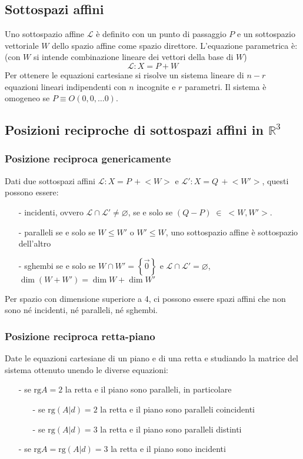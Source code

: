 \documentclass[a4paper]{article}
\newcommand\rg{\text{rg}} 		%
\begin{document}
\subsection{Sottospazi affini}
Uno sottospazio affine \(\mathcal{L}\) è definito con un punto di passaggio \(P\) e un sottospazio vettoriale \(W\) dello spazio
affine come spazio direttore. L'equazione parametrica è: (con \(W\) si intende combinazione lineare dei vettori della base di \(W\))
\[\mathcal{L} : X = P + W\]
Per ottenere le equazioni cartesiane si risolve un sistema lineare di \(n-r\) equazioni lineari indipendenti con \(n\) incognite
e \(r\) parametri. Il sistema è omogeneo se \(P \equiv O(0,0, \dots 0)\).

\subsection{Posizioni reciproche di sottospazi affini in \(\mathbb{R}^3\)}
\subsubsection*{Posizione reciproca genericamente}
Dati due sottospazi affini \(\mathcal{L}: X = P \, + \! <W>\) e \(\mathcal{L}': X = Q \, + \! <W'>\), questi possono essere:
\begin{itemize}[topsep=3pt, itemsep=0pt]
	\item[-] incidenti, ovvero \(\mathcal{L} \cap \mathcal{L}' \neq \varnothing\), se e solo se \((Q-P) \; \in \; <W, W'>\).
	\item[-] paralleli se e solo se \(W \leq W'\) o \(W' \leq W\), uno sottospazio affine è sottospazio dell'altro 
	\item[-] sghembi se e solo se \(W \cap W' = \left\{ \vec{0} \right\}\) e \(\mathcal{L} \cap \mathcal{L}' = \varnothing\), \(\dim (W + W') = \dim W + \dim W'\)
\end{itemize}
Per spazio con dimensione superiore a 4, ci possono essere spazi affini che non sono né incidenti, né paralleli, né sghembi.

\subsubsection*{Posizione reciproca retta-piano}
Date le equazioni cartesiane di un piano e di una retta e studiando la matrice del sistema ottenuto unendo le diverse equazioni:
\begin{itemize}[topsep=3pt, itemsep=0pt]
	\item[-] se \(\rg A = 2\) la retta e il piano sono paralleli, in particolare
	\begin{itemize}[topsep=3pt, itemsep=0pt]
		\item[-] se \(\rg (A|d) = 2\) la retta e il piano sono paralleli coincidenti
		\item[-] se \(\rg (A|d) = 3\) la retta e il piano sono paralleli distinti
	\end{itemize}
	\item[-] se \(\rg A = \rg (A|d) = 3\) la retta e il piano sono incidenti
\end{itemize}
\end{document}
